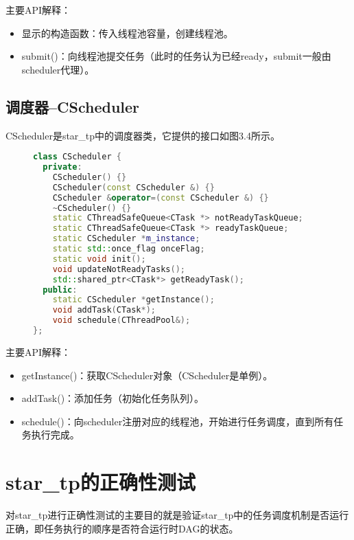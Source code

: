 主要API解释：

\begin{itemize}
	\item 显示的构造函数：传入线程池容量，创建线程池。
	\item submit()：向线程池提交任务（此时的任务认为已经ready，submit一般由scheduler代理）。
\end{itemize}

\subsection{调度器--CScheduler}

CScheduler是star\_tp中的调度器类，它提供的接口如图3.4所示。

\begin{figure}[!htbp]
    \centering
\begin{lstlisting}[language=c++,caption={}]
class CScheduler {
  private:
    CScheduler() {}
    CScheduler(const CScheduler &) {}
    CScheduler &operator=(const CScheduler &) {}
    ~CScheduler() {}
    static CThreadSafeQueue<CTask *> notReadyTaskQueue;
    static CThreadSafeQueue<CTask *> readyTaskQueue;
    static CScheduler *m_instance;
    static std::once_flag onceFlag;
    static void init();
    void updateNotReadyTasks();
    std::shared_ptr<CTask*> getReadyTask();
  public:
    static CScheduler *getInstance();
    void addTask(CTask*);
    void schedule(CThreadPool&);
};
\end{lstlisting}
    \label{fig:3_cscheduler}
\end{figure}

主要API解释：

\begin{itemize}
	\item getInstance()：获取CScheduler对象（CScheduler是单例）。
	\item addTask()：添加任务（初始化任务队列）。
	\item schedule()：向scheduler注册对应的线程池，开始进行任务调度，直到所有任务执行完成。
\end{itemize}

\section{star\_tp的正确性测试}

对star\_tp进行正确性测试的主要目的就是验证star\_tp中的任务调度机制是否运行正确，即任务执行的顺序是否符合运行时DAG的状态。

